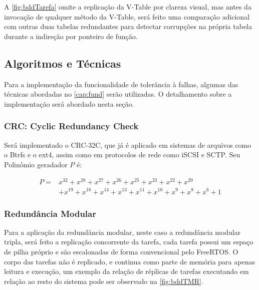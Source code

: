 A \autoref{fig:bddTarefa} omite a replicação da V-Table por clareza visual, mas antes da invocação de qualquer método da V-Table, será feito uma comparação adicional com outras duas tabelas redundantes para detectar corrupções na própria tabela durante a indireção por ponteiro de função.

\subsection{Algoritmos e Técnicas} \label{subsec:algoritmos}

Para a implementação da funcionalidade de tolerância à falhas, algumas das técnicas abordadas no \autoref{cap:fund} serão utilizadas. O detalhamento sobre a implementação será abordado nesta seção.

\subsubsection{CRC: Cyclic Redundancy Check}

Será implementado o CRC-32C, que já é aplicado em sistemas de arquivos como o Btrfs e o ext4, assim como em protocolos de rede como iSCSI e SCTP. Seu Polinômio geradador $P$ é:

\begin{equation}
	\begin{split}
		P = & x^{32} + x^{28} + x^{27} + x^{26} + x^{25} + x^{23} + x^{22} + x^{20} \\
	        & + x^{19} + x^{18} + x^{14} + x^{13} + x^{11} + x^{10} + x^{9} + x^{8} + x^{6} + 1
	\end{split}
\end{equation}


\subsubsection{Redundância Modular}

Para a aplicação da redundância modular, neste caso a redundância modular tripla, será feito a replicação concorrente da tarefa, cada tarefa possui um espaço de pilha próprio e são escalonadas de forma convencional pelo FreeRTOS. O corpo das tarefas não é replicado, e continua como parte de memória para apenas leitura e execução, um exemplo da relação de réplicas de tarefas executando em relação ao resto do sistema pode ser observado na \autoref{fig:bddTMR}.

